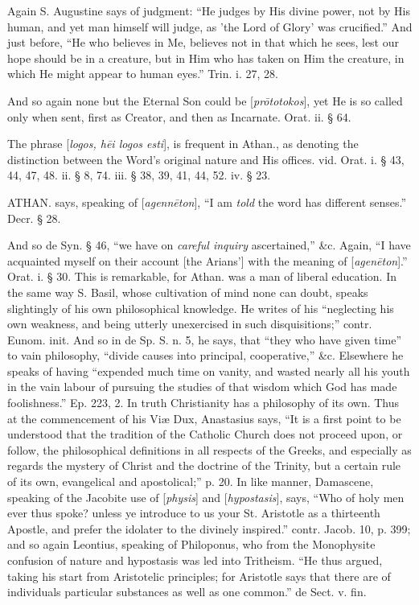 Again
S. Augustine says of judgment: ``He judges by His divine power, not by
His human, and yet man himself will judge, as 'the Lord of Glory' was
crucified.'' And just before, ``He who believes in Me, believes not in
that which he sees, lest our hope should be in a creature, but in Him
who has taken on Him the creature, in which He might appear to
human eyes.'' Trin. i. 27, 28.

And
so again none but the Eternal Son could be [\emph{pr\={o}totokos}],
yet He is so called only when sent, first as Creator, and then as
Incarnate. Orat. ii. § 64.

The
phrase [\emph{logos, h\={e}i logos esti}], is frequent in Athan.,
as denoting the distinction between the Word's original nature and His
offices. vid. Orat. i. § 43, 44, 47, 48. ii. § 8, 74. iii. § 38,
39, 41, 44, 52. iv. § 23.


ATHAN.
says, speaking of [\emph{agenn\={e}ton}], ``I am \emph{told} the
word has different senses.'' Decr. § 28.

And
so de Syn. § 46, ``we have on \emph{careful inquiry} ascertained,''
\&c. Again, ``I have acquainted myself on their account [the Arians']
with the meaning of [\emph{agen\={e}ton}].'' Orat. i. § 30. This is
remarkable, for Athan. was a man of liberal education. In the same way
S. Basil, whose cultivation of mind none can doubt, speaks slightingly
of his own philosophical knowledge. He writes of his ``neglecting his
own weakness, and being utterly unexercised in such disquisitions;''
contr. Eunom. init. And so in de Sp. S. n. 5, he says, that ``they who
have given time'' to vain philosophy, ``divide causes into principal,
cooperative,'' \&c. Elsewhere he speaks of having ``expended much
time on vanity, and wasted nearly all his youth in the vain labour of
pursuing the studies of that wisdom which God has made foolishness.''
Ep. 223, 2. In truth Christianity has a philosophy of its own. Thus at
the commencement of his Viæ Dux, Anastasius says, ``It is a first
point to be understood that the tradition of the Catholic Church does
not proceed upon, or follow, the philosophical definitions in all
respects of the Greeks, and especially as regards the mystery of
Christ and the doctrine of the Trinity, but a certain rule of
its own, evangelical and apostolical;'' p. 20. In like manner,
Damascene, speaking of the Jacobite use of [\emph{physis}] and [\emph{hypostasis}],
says, ``Who of holy men ever thus spoke? unless ye introduce to us your
St. Aristotle as a thirteenth Apostle, and prefer the idolater to the
divinely inspired.'' contr. Jacob. 10, p. 399; and so again Leontius,
speaking of Philoponus, who from the Monophysite confusion of nature
and hypostasis was led into Tritheism. ``He thus argued, taking his
start from Aristotelic principles; for Aristotle says that there are
of individuals particular substances as well as one common.'' de Sect.
v. fin.

